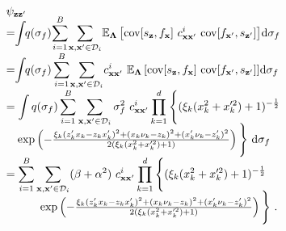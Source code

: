 \documentclass[conference]{IEEEtran}
\begin{document}
	\begin{equation*}
		\hspace{-1.7mm}
		\begin{array}{l}
			\psi_{\mathbf{z}\mathbf{z}'} \vspace{-1mm}\\
			\displaystyle=\hspace{-1mm}\int \hspace{-1mm} q(\sigma_f)\hspace{-0.5mm} \sum_{i=1}^{B}\hspace{-0.5mm}\sum_{\mathbf{x},\mathbf{x}'\in\mathcal{D}_i}\hspace{-0.5mm}\mathbb{E}_{\mathbf{\Lambda}}\left[\mathrm{cov}[s_\mathbf{z},f_\mathbf{x}]\ c^{i}_{\mathbf{x}\mathbf{x}'}\ \mathrm{cov}[f_{\mathbf{x}'},s_{\mathbf{z}'}] \right]\hspace{-0.5mm} \mathrm{d}\sigma_f \\
			\displaystyle=\hspace{-1mm}\int\hspace{-1mm} q(\sigma_f) \sum_{i=1}^{B}\hspace{-0.5mm}\sum_{\mathbf{x},\mathbf{x}'\in\mathcal{D}_i}\hspace{-0.5mm}c^{i}_{\mathbf{x}\mathbf{x}'}\ \mathbb{E}_{\mathbf{\Lambda}}\left[\mathrm{cov}[s_\mathbf{z},f_\mathbf{x}]\ \mathrm{cov}[f_{\mathbf{x}'},s_{\mathbf{z}'}] \right]\hspace{-0.5mm} \mathrm{d}\sigma_f \\
			\displaystyle=\int q(\sigma_f)\sum_{i=1}^{B}\sum_{\mathbf{x},\mathbf{x}'\in\mathcal{D}_i}\sigma_f^2\ c^{i}_{\mathbf{x}\mathbf{x}'}\prod_{k=1}^{d}\Bigg\{(\xi_k(x_{k}^2+x_{k}^{\prime2})+1)^{-\frac{1}{2}} \vspace{-1mm}\\
			\quad\exp\left(-\frac{\xi_k(z'_{k}x_{k}-z_{k}x'_{k})^2+(x_{k}\nu_k-z_{k})^2+(x'_{k}\nu_k-z'_{k})^2}{2(\xi_k(x_{k}^2+x_{k}^{\prime 2})+1)}\right)\Bigg\}\ \mathrm{d}\sigma_f \\
			\displaystyle= \sum_{i=1}^{B}\sum_{\mathbf{x},\mathbf{x}'\in\mathcal{D}_i}(\beta+\alpha^2)\ c^{i}_{\mathbf{x}\mathbf{x}'}\prod_{k=1}^{d}\Bigg\{(\xi_k(x_{k}^2+x_{k}^{\prime2})+1)^{-\frac{1}{2}} \vspace{-1mm}\\
			\qquad\quad\exp\left(-\frac{\xi_k(z'_{k}x_{k}-z_{k}x'_{k})^2+(x_{k}\nu_k-z_{k})^2+(x'_{k}\nu_k-z'_{k})^2}{2(\xi_k(x_{k}^2+x_{k}^{\prime 2})+1)}\right)\Bigg\}\ . 
		\end{array}
	\end{equation*}
\end{document}
